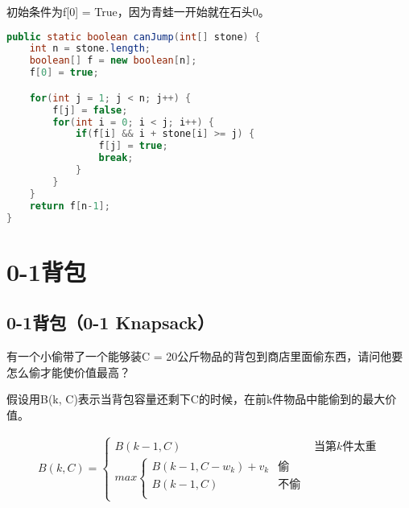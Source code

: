 初始条件为f[0] = True，因为青蛙一开始就在石头0。\\


\begin{lstlisting}[language=Java]
public static boolean canJump(int[] stone) {
    int n = stone.length;
    boolean[] f = new boolean[n];
    f[0] = true;

    for(int j = 1; j < n; j++) {
        f[j] = false;
        for(int i = 0; i < j; i++) {
            if(f[i] && i + stone[i] >= j) {
                f[j] = true;
                break;
            }
        }
    }
    return f[n-1];
}
\end{lstlisting}

\newpage

\section{0-1背包}

\subsection{0-1背包（0-1 Knapsack）}

有一个小偷带了一个能够装C = 20公斤物品的背包到商店里面偷东西，请问他要怎么偷才能使价值最高？

\begin{table}[H]
	\centering
	\caption{物品信息}
\end{table}

假设用B(k, C)表示当背包容量还剩下C的时候，在前k件物品中能偷到的最大价值。

\vspace{-0.5cm}

\begin{align*}
	B(k, C) = \begin{cases}
		B(k-1, C) & \text{当第}k\text{件太重} \\
		max \begin{cases}
			B(k-1, C-w_k) + v_k & \text{偷}   \\
			B(k-1, C)           & \text{不偷} \\
		\end{cases}
	\end{cases}
\end{align*}

